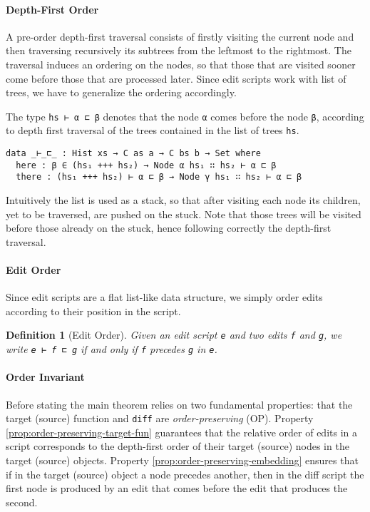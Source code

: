 \documentclass{sigplanconf}
\theoremstyle{plain}
\newtheorem{definition}{Definition}
\begin{document}
    \paragraph{Depth-First Order}
    A pre-order depth-first traversal consists of firstly visiting the current node 
    and then traversing recursively its subtrees from the leftmost to the rightmost.
    The traversal induces an ordering on the nodes, so that those that
    are visited sooner come before those that are processed later.
    Since edit scripts work with list of trees, we have to generalize the
    ordering accordingly.
    
    The type \texttt{hs ⊢ α ⊏ β} denotes that the node \texttt{α}
    comes before the node \texttt{β}, according to depth first
    traversal of the trees contained in the list of trees \texttt{hs}.
\begin{verbatim}
data _⊢_⊏_ : Hist xs → C as a → C bs b → Set where
  here : β ∈ (hs₁ +++ hs₂) → Node α hs₁ ∷ hs₂ ⊢ α ⊏ β
  there : (hs₁ +++ hs₂) ⊢ α ⊏ β → Node γ hs₁ ∷ hs₂ ⊢ α ⊏ β
\end{verbatim}

    Intuitively the list is used as a stack, so that after visiting
    each node its children, yet to be traversed, are pushed on the stuck.
    Note that those trees will be visited before those already on the stuck,
    hence following correctly the depth-first traversal.

    \paragraph{Edit Order}
    Since edit scripts are a flat list-like data structure, we simply
    order edits according to their position in the script.

\begin{definition}[Edit Order]
Given an edit script \texttt{e} and two edits \texttt{f} and \texttt{g}, we write
\texttt{e ⊢ f ⊏ g} if and only if \texttt{f} precedes \texttt{g} in \texttt{e}.
\end{definition}

\paragraph{Order Invariant}
Before stating the main theorem relies on two fundamental properties:
that the target (source) function and \texttt{diff} are
\emph{order-preserving} (OP).
%
Property \ref{prop:order-preserving-target-fun} guarantees that the
relative order of edits in a script corresponds to the depth-first
order of their target (source) nodes in the target (source) objects.
%
Property \ref{prop:order-preserving-embedding} ensures that if in the
target (source) object a node precedes another, then in the diff
script the first node is produced by an edit that comes before the
edit that produces the second.
\end{document}
